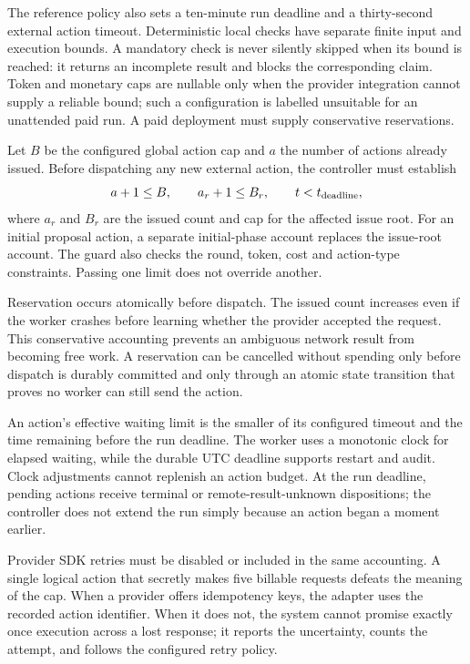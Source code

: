 The reference policy also sets a ten-minute run deadline and a thirty-second
external action timeout. Deterministic local checks have separate finite input
and execution bounds. A mandatory check is never silently skipped when its bound
is reached: it returns an incomplete result and blocks the corresponding claim.
Token and monetary caps are nullable only when the provider integration cannot
supply a reliable bound; such a configuration is labelled unsuitable for an
unattended paid run. A paid deployment must supply conservative reservations.


Let $B$ be the configured global action cap and $a$ the number of actions already
issued. Before dispatching any new external action, the controller must establish
\begin{equation}
 a+1\leq B,\qquad a_r+1\leq B_r,\qquad t<t_{\rm deadline},
 \label{eq:budget-guard}
\end{equation}
where $a_r$ and $B_r$ are the issued count and cap for the affected issue root.
For an initial proposal action, a separate initial-phase account replaces the
issue-root account. The guard also checks the round, token, cost and action-type
constraints. Passing one limit does not override another.

Reservation occurs atomically before dispatch. The issued count increases even if
the worker crashes before learning whether the provider accepted the request.
This conservative accounting prevents an ambiguous network result from becoming
free work. A reservation can be cancelled without spending only before dispatch
is durably committed and only through an atomic state transition that proves no
worker can still send the action.

An action's effective waiting limit is the smaller of its configured timeout
and the time remaining before the run deadline. The worker uses a monotonic clock
for elapsed waiting, while the durable UTC deadline supports restart and audit.
Clock adjustments cannot replenish an action budget. At the run deadline, pending
actions receive terminal or remote-result-unknown dispositions; the controller
does not extend the run simply because an action began a moment earlier.

Provider SDK retries must be disabled or included in the same accounting. A
single logical action that secretly makes five billable requests defeats the
meaning of the cap. When a provider offers idempotency keys, the adapter uses the
recorded action identifier. When it does not, the system cannot promise exactly
once execution across a lost response; it reports the uncertainty, counts the
attempt, and follows the configured retry policy.

